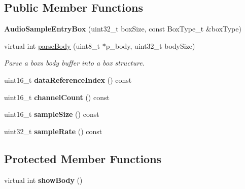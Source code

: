 \subsection*{Public Member Functions}
\begin{DoxyCompactItemize}
\item 
\mbox{\label{classmp4_parser_1_1_audio_sample_entry_box_acbe4397876d40597c52f99ce10917497}} 
{\bfseries Audio\+Sample\+Entry\+Box} (uint32\+\_\+t box\+Size, const Box\+Type\+\_\+t \&box\+Type)
\item 
virtual int \mbox{\hyperlink{classmp4_parser_1_1_audio_sample_entry_box_ab65dfb4aee59ecd374567ceafe58de4f}{parse\+Body}} (uint8\+\_\+t $\ast$p\+\_\+body, uint32\+\_\+t body\+Size)
\begin{DoxyCompactList}\small\item\em Parse a box\textquotesingle{}s body buffer into a box structure. \end{DoxyCompactList}\item 
\mbox{\label{classmp4_parser_1_1_audio_sample_entry_box_ad06eb80e0f27a91a1f49c22e0ce579a7}} 
uint16\+\_\+t {\bfseries data\+Reference\+Index} () const
\item 
\mbox{\label{classmp4_parser_1_1_audio_sample_entry_box_adf39b7460c6f49caa64a78ab5bf46a60}} 
uint16\+\_\+t {\bfseries channel\+Count} () const
\item 
\mbox{\label{classmp4_parser_1_1_audio_sample_entry_box_a5aeef437fe626539328e23db43f893f0}} 
uint16\+\_\+t {\bfseries sample\+Size} () const
\item 
\mbox{\label{classmp4_parser_1_1_audio_sample_entry_box_abab3df944b22a818ffcc1305ba54b321}} 
uint32\+\_\+t {\bfseries sample\+Rate} () const
\end{DoxyCompactItemize}
\subsection*{Protected Member Functions}
\begin{DoxyCompactItemize}
\item 
\mbox{\label{classmp4_parser_1_1_audio_sample_entry_box_ab4a72332ecb3dc06b36aac11a5eb902c}} 
virtual int {\bfseries show\+Body} ()
\end{DoxyCompactItemize}
